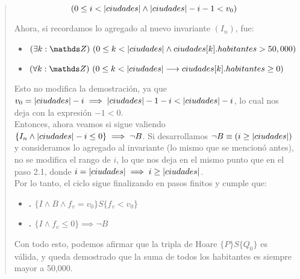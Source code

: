 \documentclass[10pt,a4paper]{article}
\begin{document}
\begin{quote}
\[
(0 \leq i < |ciudades| \land |ciudades| - i - 1 < v_0)
\]

Ahora, si recordamos lo agregado al nuevo invariante $(I_n)$, fue:

\begin{itemize}
	\item $\existe[unalinea]{k}{\ent}{0 \leq k < \longitud{ciudades} \land ciudades[k].habitantes > 50,000}$
	\item $\paraTodo[unalinea]{k}{\ent}{0 \leq k < \longitud{ciudades} \implica ciudades[k].habitantes \geq 0}$
\end{itemize}

Esto no modifica la demostración, ya que $v_0 = |ciudades| - i \implies |ciudades| - 1 - i < |ciudades| - i$, lo cual nos deja con la expresión $-1 < 0$. \\[0.2cm]

Entonces, ahora veamos si sigue valiendo $\{I_n \land |ciudades| - i \leq 0\} \implies \neg B$. Si desarrollamos $\neg B \equiv (i \geq |ciudades|)$ y consideramos lo agregado al invariante (lo mismo que se mencionó antes), no se modifica el rango de $i$, lo que nos deja en el mismo punto que en el paso 2.1, donde $i = |ciudades| \implies i \geq |ciudades|$. \\[0.2cm]

Por lo tanto, el ciclo sigue finalizando en pasos finitos y cumple que: 

\begin{itemize}
	\item \textbf{. $\{I \land B \land f_v = v_0\} S \{f_v < v_0\}$} \checkmark
	\item \textbf{. $\{I \land f_v \leq 0\} \implies \neg B$} \checkmark
\end{itemize}

Con todo esto, podemos afirmar que la tripla de Hoare $\{P\} S \{Q_0\}$ es válida, y queda demostrado que la suma de todos los habitantes es siempre mayor a 50,000.
\end{quote}
\end{document}
